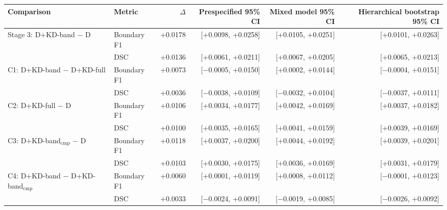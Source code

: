 \begin{tabular}{@{}llrrrr@{}}
\toprule
Comparison & Metric & $\Delta$ & Prespecified 95\% CI & Mixed model 95\% CI & Hierarchical bootstrap 95\% CI \\
\midrule
Stage 3: D+KD-band $-$ D & Boundary F1 & +0.0178 & [+0.0098, +0.0258] & [+0.0105, +0.0251] & [+0.0101, +0.0263] \\
 & DSC & +0.0136 & [+0.0061, +0.0211] & [+0.0067, +0.0205] & [+0.0065, +0.0213] \\
C1: D+KD-band $-$ D+KD-full & Boundary F1 & +0.0073 & [$-$0.0005, +0.0150] & [+0.0002, +0.0144] & [$-$0.0004, +0.0151] \\
 & DSC & +0.0036 & [$-$0.0038, +0.0109] & [$-$0.0032, +0.0104] & [$-$0.0037, +0.0111] \\
C2: D+KD-full $-$ D & Boundary F1 & +0.0106 & [+0.0034, +0.0177] & [+0.0042, +0.0169] & [+0.0037, +0.0182] \\
 & DSC & +0.0100 & [+0.0035, +0.0165] & [+0.0041, +0.0159] & [+0.0039, +0.0169] \\
C3: D+KD-band$_{\mathrm{cmp}}$ $-$ D & Boundary F1 & +0.0118 & [+0.0037, +0.0200] & [+0.0044, +0.0192] & [+0.0039, +0.0201] \\
 & DSC & +0.0103 & [+0.0030, +0.0175] & [+0.0036, +0.0169] & [+0.0031, +0.0179] \\
C4: D+KD-band $-$ D+KD-band$_{\mathrm{cmp}}$ & Boundary F1 & +0.0060 & [+0.0001, +0.0119] & [+0.0008, +0.0112] & [$-$0.0001, +0.0123] \\
 & DSC & +0.0033 & [$-$0.0024, +0.0091] & [$-$0.0019, +0.0085] & [$-$0.0026, +0.0092] \\
\bottomrule
\end{tabular}
